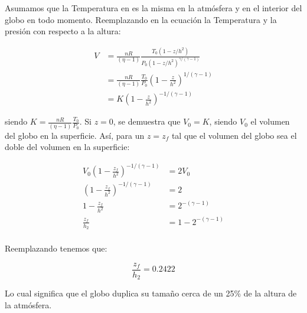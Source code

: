 Asumamos que la Temperatura en es la misma en la atmósfera y en el interior del globo en todo momento. Reemplazando en la ecuación la Temperatura y la presión con respecto a la altura:

\begin{align*}
    V &= \frac{n R}{(\eta-1)} \frac{T_0 ( 1 - z/h^2)}{P_0 (1 - z/h^2)^{\gamma / (\gamma - 1)}} \\
    &= \frac{n R}{(\eta-1)} \frac{T_0}{P_0} (1 - \frac{z}{h^2})^{1/(\gamma - 1)} \\
    &= K (1 - \frac{z}{h^2})^{-1/(\gamma - 1)}
\end{align*}

siendo $K = \frac{n R}{(\eta-1)} \frac{T_0}{P_0}$. Si $z=0$, se demuestra que $ V_0 = K$, siendo $V_0$ el volumen del globo en la superficie. Así, para un $z=z_f$ tal que el volumen del globo sea el doble del volumen en la superficie:

\begin{align*}
    V_0 (1 - \frac{z_f}{h^2})^{-1/(\gamma - 1)} &=2 V_0\\
    (1 - \frac{z_f}{h^2})^{-1/(\gamma - 1)} &=2\\
    1 - \frac{z_f}{h^2} &= 2^{-(\gamma - 1)}\\
    \frac{z_f}{h_2} &= 1 - 2^{-(\gamma - 1)}\\
\end{align*}


Reemplazando tenemos que:

\begin{equation}
    \boxed{\frac{z_f}{h_2} = 0.2422}
\end{equation}

Lo cual significa que el globo duplica su tamaño cerca de un 25\% de la altura de la atmósfera.